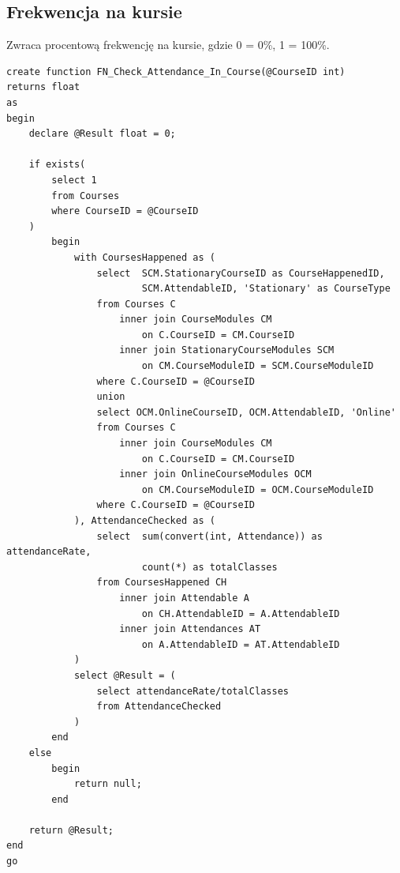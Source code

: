 \documentclass[11pt,a4paper]{article}
\begin{document}
\subsection{Frekwencja na kursie}
Zwraca procentową frekwencję na kursie, gdzie 0 = 0\%, 1 = 100\%.
\begin{Verbatim}[breaklines=true]
create function FN_Check_Attendance_In_Course(@CourseID int)
returns float
as
begin
    declare @Result float = 0;

    if exists(
        select 1
        from Courses
        where CourseID = @CourseID
    )
        begin
            with CoursesHappened as (
                select  SCM.StationaryCourseID as CourseHappenedID, 
                        SCM.AttendableID, 'Stationary' as CourseType
                from Courses C
                    inner join CourseModules CM 
                        on C.CourseID = CM.CourseID
                    inner join StationaryCourseModules SCM 
                        on CM.CourseModuleID = SCM.CourseModuleID
                where C.CourseID = @CourseID
                union
                select OCM.OnlineCourseID, OCM.AttendableID, 'Online'
                from Courses C
                    inner join CourseModules CM 
                        on C.CourseID = CM.CourseID
                    inner join OnlineCourseModules OCM 
                        on CM.CourseModuleID = OCM.CourseModuleID
                where C.CourseID = @CourseID
            ), AttendanceChecked as (
                select  sum(convert(int, Attendance)) as attendanceRate, 
                        count(*) as totalClasses
                from CoursesHappened CH
                    inner join Attendable A 
                        on CH.AttendableID = A.AttendableID
                    inner join Attendances AT 
                        on A.AttendableID = AT.AttendableID
            )
            select @Result = (
                select attendanceRate/totalClasses
                from AttendanceChecked
            )
        end
    else
        begin
            return null;
        end

    return @Result;
end
go
\end{Verbatim}
\end{document}
